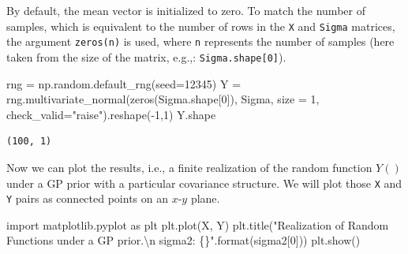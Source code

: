 \documentclass[
  letterpaper,
  DIV=11,
  numbers=noendperiod]{scrreprt}
\newenvironment{Shaded}{\begin{snugshade}}{\end{snugshade}}
\newcommand{\BuiltInTok}[1]{\textcolor[rgb]{0.00,0.23,0.31}{#1}}
\newcommand{\CharTok}[1]{\textcolor[rgb]{0.13,0.47,0.30}{#1}}
\newcommand{\DecValTok}[1]{\textcolor[rgb]{0.68,0.00,0.00}{#1}}
\newcommand{\ImportTok}[1]{\textcolor[rgb]{0.00,0.46,0.62}{#1}}
\newcommand{\NormalTok}[1]{\textcolor[rgb]{0.00,0.23,0.31}{#1}}
\newcommand{\OperatorTok}[1]{\textcolor[rgb]{0.37,0.37,0.37}{#1}}
\newcommand{\SpecialCharTok}[1]{\textcolor[rgb]{0.37,0.37,0.37}{#1}}
\newcommand{\StringTok}[1]{\textcolor[rgb]{0.13,0.47,0.30}{#1}}
\begin{document}
By default, the mean vector is initialized to zero. To match the number
of samples, which is equivalent to the number of rows in the \texttt{X}
and \texttt{Sigma} matrices, the argument \texttt{zeros(n)} is used,
where \texttt{n} represents the number of samples (here taken from the
size of the matrix, e.g.,: \texttt{Sigma.shape{[}0{]}}).

\begin{Shaded}
\begin{Highlighting}[]
\NormalTok{rng }\OperatorTok{=}\NormalTok{ np.random.default\_rng(seed}\OperatorTok{=}\DecValTok{12345}\NormalTok{)}
\NormalTok{Y }\OperatorTok{=}\NormalTok{ rng.multivariate\_normal(zeros(Sigma.shape[}\DecValTok{0}\NormalTok{]), Sigma, size }\OperatorTok{=} \DecValTok{1}\NormalTok{, check\_valid}\OperatorTok{=}\StringTok{"raise"}\NormalTok{).reshape(}\OperatorTok{{-}}\DecValTok{1}\NormalTok{,}\DecValTok{1}\NormalTok{)}
\NormalTok{Y.shape}
\end{Highlighting}
\end{Shaded}

\begin{verbatim}
(100, 1)
\end{verbatim}

Now we can plot the results, i.e., a finite realization of the random
function \(Y()\) under a GP prior with a particular covariance
structure. We will plot those \texttt{X} and \texttt{Y} pairs as
connected points on an \(x\)-\(y\) plane.

\begin{Shaded}
\begin{Highlighting}[]
\ImportTok{import}\NormalTok{ matplotlib.pyplot }\ImportTok{as}\NormalTok{ plt}
\NormalTok{plt.plot(X, Y)}
\NormalTok{plt.title(}\StringTok{"Realization of Random Functions under a GP prior.}\CharTok{\textbackslash{}n}\StringTok{ sigma2: }\SpecialCharTok{\{\}}\StringTok{"}\NormalTok{.}\BuiltInTok{format}\NormalTok{(sigma2[}\DecValTok{0}\NormalTok{]))}
\NormalTok{plt.show()}
\end{Highlighting}
\end{Shaded}
\end{document}
